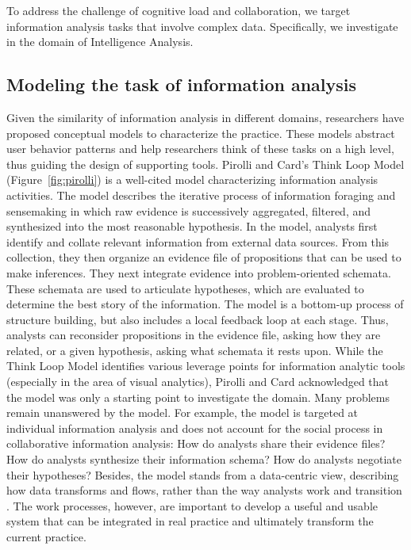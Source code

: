 To address the challenge of cognitive load and collaboration, we
target information analysis tasks that involve complex data. Specifically, we investigate in the domain of Intelligence Analysis. 

\subsection{Modeling the task of information analysis}
Given the similarity of information analysis in different domains, researchers have proposed conceptual models to characterize the practice. These models abstract user behavior patterns and help researchers think of these tasks on a high level, thus guiding the design of supporting tools. Pirolli and Card’s \citep{Pirolli2005}
Think Loop Model (Figure~\ref{fig:pirolli}) is a well-cited model characterizing information
analysis activities. The model describes the iterative process of information
foraging and sensemaking in which raw evidence is successively aggregated,
filtered, and synthesized into the most reasonable hypothesis. In the model, analysts first
identify and collate relevant information from external data sources. From this
collection, they then organize an evidence file of propositions that can be used
to make inferences. They next integrate evidence into problem-oriented schemata.
These schemata are used to articulate hypotheses, which are evaluated to
determine the best story of the information. The model is a bottom-up process of
structure building, but also includes a local feedback loop at each stage. Thus,
analysts can reconsider propositions in the evidence file, asking how they are
related, or a given hypothesis, asking what schemata it rests upon. While the
Think Loop Model identifies various leverage points for information analytic
tools (especially in the area of visual analytics), Pirolli and Card acknowledged that the
model was only a starting point to investigate the domain. Many problems remain
unanswered by the model. For example, the model is targeted at individual
information analysis and does not account for the social process in
collaborative information analysis: How do analysts share their evidence files?
How do analysts synthesize their information schema? How do analysts negotiate
their hypotheses? Besides, the model stands from a data-centric view, describing
how data transforms and flows, rather than the way analysts work and transition
\citep{Kang2012b}. The work processes, however, are important to
develop a useful and usable system that can be integrated in real practice and
ultimately transform the current practice.

